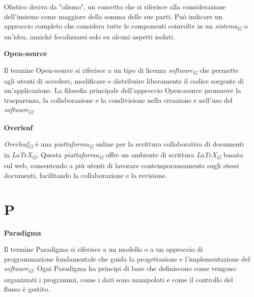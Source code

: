 \documentclass{article}
\begin{document}
\vspace{0.1cm}

Olistico deriva da "olismo", un concetto che si riferisce alla considerazione dell'insieme come maggiore della somma delle sue parti. Può indicare un approccio completo che considera tutte le componenti coinvolte in un \textit{sistema}\textsubscript{\textit{G}} o un'idea, anziché focalizzarsi solo su alcuni aspetti isolati. 

\vspace{0.4cm}

\textbf{Open-source}

\vspace{0.1cm}

Il termine Open-source si riferisce a un tipo di licenza \textit{software}\textsubscript{\textit{G}} che permette agli utenti di accedere, modificare e distribuire liberamente il codice sorgente di un'applicazione. La filosofia principale dell'approccio Open-source promuove la trasparenza, la collaborazione e la condivisione nella creazione e nell'uso del \textit{software}\textsubscript{\textit{G}}.

\vspace{0.4cm}

\textbf{Overleaf}

\vspace{0.1cm}

\textit{Overleaf}\textsubscript{\textit{G}} è una \textit{piattaforma}\textsubscript{\textit{G}} online per la scrittura collaborativa di documenti in \textit{LaTeX}\textsubscript{\textit{G}}. Questa \textit{piattaforma}\textsubscript{\textit{G}} offre un ambiente di scrittura \textit{LaTeX}\textsubscript{\textit{G}} basato sul web, consentendo a più utenti di lavorare contemporaneamente sugli stessi documenti, facilitando la collaborazione e la revisione.

\pagebreak
\section*{P}
{}

\vspace{0.4cm}

\textbf{Paradigma}

\vspace{0.1cm}

Il termine Paradigma si riferisce a un modello o a un approccio di programmazione fondamentale che guida la progettazione e l'implementazione del \textit{software}\textsubscript{\textit{G}}. Ogni Paradigma ha principi di base che definiscono come vengono organizzati i programmi, come i dati sono manipolati e come il controllo del flusso è gestito.
\end{document}
